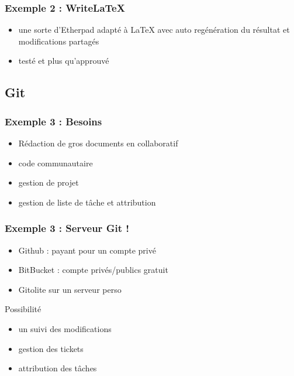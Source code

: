 \documentclass{beamer}
\begin{document}
\begin{frame}
    \frametitle{Exemple 2 : Write\LaTeX{}}

    \begin{itemize}
        \item une sorte d'Etherpad adapté à LaTeX avec auto regénération du résultat et modifications partagés
        \item testé et plus qu'approuvé
    \end{itemize}

\end{frame}


\subsection{Git} %

\begin{frame}
    \frametitle{Exemple 3 : Besoins}

    \begin{itemize}
        \item Rédaction de gros documents en collaboratif
        \item code communautaire
        \item gestion de projet
        \item gestion de liste de tâche et attribution
    \end{itemize}

\end{frame}

\begin{frame}
    \frametitle{Exemple 3 : Serveur Git !}

    \begin{itemize}
        \item Github : payant pour un compte privé
        \item BitBucket : compte privés/publics gratuit
        \item Gitolite sur un serveur perso
    \end{itemize}

    \pause

    \begin{block}{Possibilité}

        \begin{itemize}
            \item un suivi des modifications
            \item gestion des tickets
            \item attribution des tâches
        \end{itemize}
    \end{block}

\end{frame}
\end{document}
